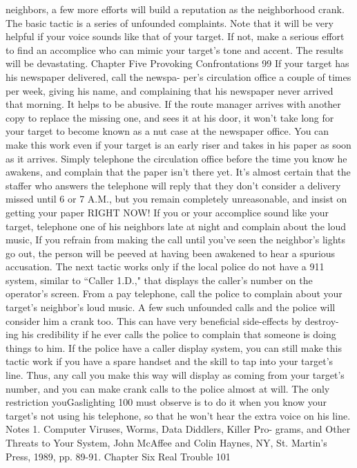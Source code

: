 \documentclass{book}
\begin{document}
neighbors, a few more efforts will build a reputation as the 
neighborhood crank. The basic tactic is a series of unfounded 
complaints. Note that it will be very helpful if your voice 
sounds like that of your target. If not, make a serious effort to 
find an accomplice who can mimic your target's tone and 
accent. The results will be devastating. 
Chapter Five 
Provoking Confrontations 
99 
If your target has his newspaper delivered, call the newspa- 
per's circulation office a couple of times per week, giving his 
name, and complaining that his newspaper never arrived that 
morning. It helps to be abusive. If the route manager arrives 
with another copy to replace the missing one, and sees it at his 
door, it won't take long for your target to become known as a 
nut case at the newspaper office. 
You can make this work even if your target is an early riser 
and takes in his paper as soon as it arrives. Simply telephone 
the circulation office before the time you know he awakens, and 
complain that the paper isn't there yet. It's almost certain that 
the staffer who answers the telephone will reply that they don't 
consider a delivery missed until 6 or 7 A.M., but you remain 
completely unreasonable, and insist on getting your paper 
RIGHT NOW! 
If you or your accomplice sound like your target, telephone 
one of his neighbors late at night and complain about the loud 
music, If you refrain from making the call until you've seen the 
neighbor's lights go out, the person will be peeved at having 
been awakened to hear a spurious accusation. 
The next tactic works only if the local police do not have a 
911 system, similar to “Caller 1.D.," that displays the caller's 
number on the operator's screen. From a pay telephone, call the 
police to complain about your target's neighbor's loud music. A 
few such unfounded calls and the police will consider him a 
crank too. This can have very beneficial side-effects by destroy- 
ing his credibility if he ever calls the police to complain that 
someone is doing things to him. 
If the police have a caller display system, you can still make 
this tactic work if you have a spare handset and the skill to tap 
into your target's line. Thus, any call you make this way will 
display as coming from your target's number, and you can make 
crank calls to the police almost at will. The only restriction youGaslighting 
100 
must observe is to do it when you know your target's not using 
his telephone, so that he won't hear the extra voice on his line. 
Notes 
1. Computer Viruses, Worms, Data Diddlers, Killer Pro- 
grams, and Other Threats to Your System, John McAffee 
and Colin Haynes, NY, St. Martin's Press, 1989, pp. 89-91. 
Chapter Six 
Real Trouble 
101 
\end{document}
